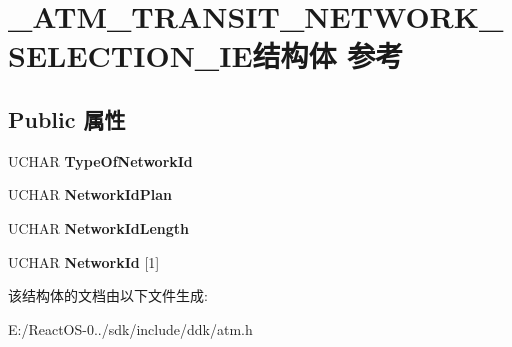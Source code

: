 \hypertarget{struct___a_t_m___t_r_a_n_s_i_t___n_e_t_w_o_r_k___s_e_l_e_c_t_i_o_n___i_e}{}\section{\+\_\+\+A\+T\+M\+\_\+\+T\+R\+A\+N\+S\+I\+T\+\_\+\+N\+E\+T\+W\+O\+R\+K\+\_\+\+S\+E\+L\+E\+C\+T\+I\+O\+N\+\_\+\+I\+E结构体 参考}
\label{struct___a_t_m___t_r_a_n_s_i_t___n_e_t_w_o_r_k___s_e_l_e_c_t_i_o_n___i_e}
\subsection*{Public 属性}
\begin{DoxyCompactItemize}
\item 
\mbox{\label{struct___a_t_m___t_r_a_n_s_i_t___n_e_t_w_o_r_k___s_e_l_e_c_t_i_o_n___i_e_abf9ddd8713fae46ecdcd0ff70c5ca07b}} 
U\+C\+H\+AR {\bfseries Type\+Of\+Network\+Id}
\item 
\mbox{\label{struct___a_t_m___t_r_a_n_s_i_t___n_e_t_w_o_r_k___s_e_l_e_c_t_i_o_n___i_e_a606aa792d0d80d110e88eec7a164012e}} 
U\+C\+H\+AR {\bfseries Network\+Id\+Plan}
\item 
\mbox{\label{struct___a_t_m___t_r_a_n_s_i_t___n_e_t_w_o_r_k___s_e_l_e_c_t_i_o_n___i_e_a3623908cda6220fa2a6418bc148a0085}} 
U\+C\+H\+AR {\bfseries Network\+Id\+Length}
\item 
\mbox{\label{struct___a_t_m___t_r_a_n_s_i_t___n_e_t_w_o_r_k___s_e_l_e_c_t_i_o_n___i_e_a365c17478647cfa1949ff32ba2234f78}} 
U\+C\+H\+AR {\bfseries Network\+Id} \mbox{[}1\mbox{]}
\end{DoxyCompactItemize}


该结构体的文档由以下文件生成\+:\begin{DoxyCompactItemize}
\item 
E\+:/\+React\+O\+S-\/0../sdk/include/ddk/atm.\+h\end{DoxyCompactItemize}
